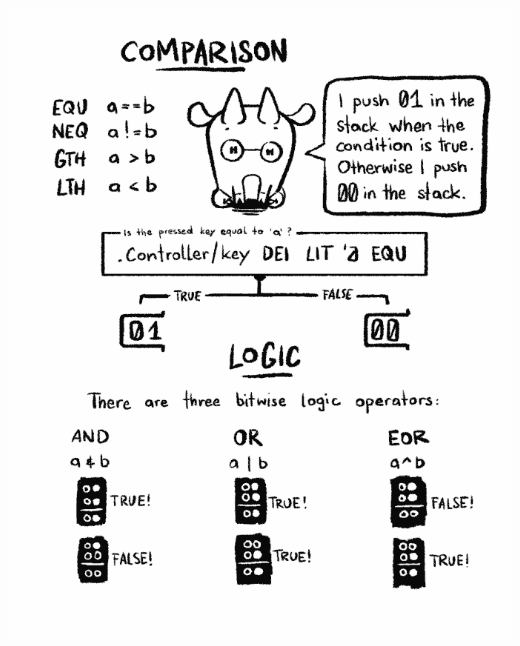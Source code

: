 \documentclass[paperheight=4.25in,paperwidth=2.75in,20pt]{article}
\begin{document}
  \includegraphics[width=1.0\paperwidth]{images/14_comparison-680.png}
  
  \newpage
  \thispagestyle{empty}
  \mbox{}
  \newpage
  
  
\end{document}
